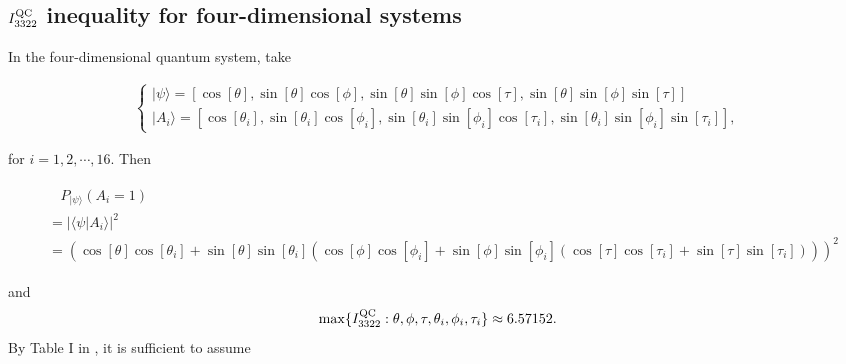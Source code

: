 \documentclass[pra,aps,notitlepage,superscriptaddress,showpacs,showkeys]{revtex4-1}
\theoremstyle{definition}
\theoremstyle{remark}
\begin{document}
\subsection{$I_{3322}^{\rm QC}$ inequality for four-dimensional systems}




 In the four-dimensional quantum system, take
\begin{widetext}
\begin{eqnarray}
\left\{
  \begin{array}{ll}
    |\psi\rangle=[\cos{[\theta]},\sin{[\theta]}\cos{[\phi]},
\sin{[\theta]}\sin{[\phi]}\cos{[\tau]},
\sin{[\theta]}\sin{[\phi]}\sin{[\tau]}] \\
    |A_i\rangle=[\cos{[\theta_i]},\sin{[\theta_i]}\cos{[\phi_i]},
\sin{[\theta_i]}\sin{[\phi_i]}\cos{[\tau_i]},
\sin{[\theta_i]}\sin{[\phi_i]}\sin{[\tau_i]}],
  \end{array}
\right.
\end{eqnarray}
\end{widetext}
for $i=1,2,\cdots, 16$. Then
\begin{widetext}
\begin{eqnarray}
\begin{split}
&~~~~P_{|\psi\rangle}(A_i=1)\\
&= |\langle \psi|A_i\rangle|^2\\
&=(\cos{[\theta]}\cos{[\theta_i]}+\sin{[\theta]}\sin{[\theta_i]}(\cos{[\phi]}\cos{[\phi_i]}
+\sin{[\phi]}\sin{[\phi_i]}(\cos{[\tau]}\cos{[\tau_i]}+\sin{[\tau]}\sin{[\tau_i]})))^2
\end{split}
\end{eqnarray}
\end{widetext} and
$$\max\{I_{3322}^{\rm QC}:\theta,\phi,\tau,\theta_i,\phi_i,\tau_i\}\approx 6.57152.$$
By Table I in \cite{MT}, it is sufficient to assume
\end{document}
